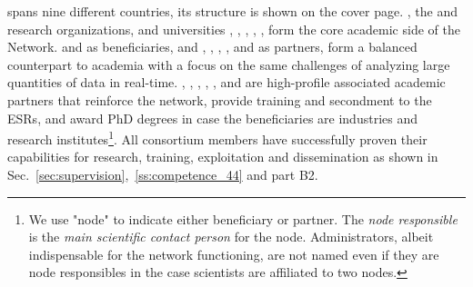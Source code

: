 \acronym spans nine different countries, its structure is shown on the cover page.
\cernentity, the \nikhefentity and \cnrsentity research organizations, and universities \sorbonneentity, \helsinkientity, \unigeentity, \dortmundentity, \lundentity, \heidelbergentity
form the core academic side of the Network. \ibmentity and \dqentity as beneficiaries, and 
\ximantisentity, \lightboxentity, \fleetmaticsentity, \cathientity, \wildtreeentity and \heidelberginstrumentsentity as partners,
form a balanced counterpart to academia with a focus on the same challenges of analyzing large quantities of data in real-time. 
\oregonentity, \ohioentity, \cincinnatientity, \pisaentity,
\santiagoentity, \radboudentity and \amsterdamentity 
are high-profile associated academic partners that reinforce the
network, provide training and secondment to the ESRs, 
and award PhD degrees in case the beneficiaries are industries and research institutes\footnote{We use "node" to indicate
either beneficiary or partner. The \textit{node responsible} is the \textit{main scientific contact person} for the node. Administrators, albeit indispensable for the network functioning, are not named even if they are node responsibles in the case scientists are affiliated to two nodes.}.
All consortium members  have successfully proven
their capabilities for research, training, exploitation and dissemination
as shown in Sec.~\ref{sec:supervision},~\ref{ss:competence_44} and part B2.    
    


